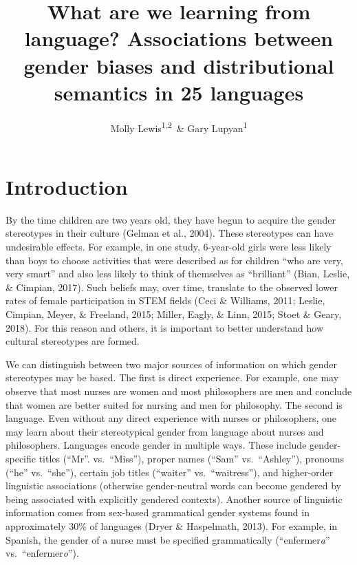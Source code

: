 \documentclass[man,floatsintext]{apa6}
\title{What are we learning from language? Associations between gender biases and distributional semantics in 25 languages}
\author{Molly Lewis\textsuperscript{1,2}~\& Gary Lupyan\textsuperscript{1}}
\date{}
\affiliation{
\vspace{0.5cm}
\textsuperscript{1} University of Wisconsin-Madison\\\textsuperscript{2} University of Chicago}
\begin{document}
\maketitle

\hypertarget{introduction}{%
\section{Introduction}\label{introduction}}

By the time children are two years old, they have begun to acquire the gender stereotypes in their culture (Gelman et al., 2004). These stereotypes can have undesirable effects. For example, in one study, 6-year-old girls were less likely than boys to choose activities that were described as for children \enquote{who are very, very smart} and also less likely to think of themselves as \enquote{brilliant} (Bian, Leslie, \& Cimpian, 2017). Such beliefs may, over time, translate to the observed lower rates of female participation in STEM fields (Ceci \& Williams, 2011; Leslie, Cimpian, Meyer, \& Freeland, 2015; Miller, Eagly, \& Linn, 2015; Stoet \& Geary, 2018). For this reason and others, it is important to better understand how cultural stereotypes are formed.

We can distinguish between two major sources of information on which gender stereotypes may be based. The first is direct experience. For example, one may observe that most nurses are women and most philosophers are men and conclude that women are better suited for nursing and men for philosophy. The second is language. Even without any direct experience with nurses or philosophers, one may learn about their stereotypical gender from language about nurses and philosophers. Languages encode gender in multiple ways. These include gender-specific titles (\enquote{Mr}. vs.~\enquote{Miss}), proper names (\enquote{Sam} vs.~\enquote{Ashley}), pronouns (\enquote{he} vs.~\enquote{she}), certain job titles (\enquote{waiter} vs.~\enquote{waitress}), and higher-order linguistic associations (otherwise gender-neutral words can become gendered by being associated with explicitly gendered contexts). Another source of linguistic information comes from sex-based grammatical gender systems found in approximately 30\% of languages (Dryer \& Haspelmath, 2013). For example, in Spanish, the gender of a nurse must be specified grammatically (\enquote{enfermer\emph{a}} vs.~\enquote{enfermer\emph{o}}).
\end{document}

